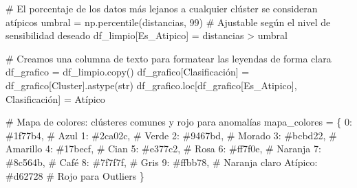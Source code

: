 \documentclass[
  spanish,
  letterpaper,
  DIV=11,
  numbers=noendperiod]{scrreprt}
\newenvironment{Shaded}{}{}
\newcommand{\BuiltInTok}[1]{\textcolor[rgb]{0.84,0.23,0.29}{#1}}
\newcommand{\CommentTok}[1]{\textcolor[rgb]{0.42,0.45,0.49}{#1}}
\newcommand{\DecValTok}[1]{\textcolor[rgb]{0.00,0.36,0.77}{#1}}
\newcommand{\NormalTok}[1]{\textcolor[rgb]{0.14,0.16,0.18}{#1}}
\newcommand{\OperatorTok}[1]{\textcolor[rgb]{0.14,0.16,0.18}{#1}}
\newcommand{\StringTok}[1]{\textcolor[rgb]{0.01,0.18,0.38}{#1}}
\begin{document}
\begin{Shaded}
\begin{Highlighting}[numbers=left,,]
\CommentTok{\# El porcentaje de los datos más lejanos a cualquier clúster se consideran atípicos}
\NormalTok{umbral }\OperatorTok{=}\NormalTok{ np.percentile(distancias, }\DecValTok{99}\NormalTok{)  }\CommentTok{\# Ajustable según el nivel de sensibilidad deseado}
\NormalTok{df\_limpio[}\StringTok{\textquotesingle{}Es\_Atipico\textquotesingle{}}\NormalTok{] }\OperatorTok{=}\NormalTok{ distancias }\OperatorTok{\textgreater{}}\NormalTok{ umbral}

\CommentTok{\# Creamos una columna de texto para formatear las leyendas de forma clara}
\NormalTok{df\_grafico }\OperatorTok{=}\NormalTok{ df\_limpio.copy()}
\NormalTok{df\_grafico[}\StringTok{\textquotesingle{}Clasificación\textquotesingle{}}\NormalTok{] }\OperatorTok{=}\NormalTok{ df\_grafico[}\StringTok{\textquotesingle{}Cluster\textquotesingle{}}\NormalTok{].astype(}\BuiltInTok{str}\NormalTok{)}
\NormalTok{df\_grafico.loc[df\_grafico[}\StringTok{\textquotesingle{}Es\_Atipico\textquotesingle{}}\NormalTok{], }\StringTok{\textquotesingle{}Clasificación\textquotesingle{}}\NormalTok{] }\OperatorTok{=} \StringTok{\textquotesingle{}Atípico\textquotesingle{}}

\CommentTok{\# Mapa de colores: clústeres comunes y rojo para anomalías}
\NormalTok{mapa\_colores }\OperatorTok{=}\NormalTok{ \{}
    \StringTok{\textquotesingle{}0\textquotesingle{}}\NormalTok{: }\StringTok{\textquotesingle{}\#1f77b4\textquotesingle{}}\NormalTok{,      }\CommentTok{\# Azul}
    \StringTok{\textquotesingle{}1\textquotesingle{}}\NormalTok{: }\StringTok{\textquotesingle{}\#2ca02c\textquotesingle{}}\NormalTok{,      }\CommentTok{\# Verde}
    \StringTok{\textquotesingle{}2\textquotesingle{}}\NormalTok{: }\StringTok{\textquotesingle{}\#9467bd\textquotesingle{}}\NormalTok{,      }\CommentTok{\# Morado}
    \StringTok{\textquotesingle{}3\textquotesingle{}}\NormalTok{: }\StringTok{\textquotesingle{}\#bcbd22\textquotesingle{}}\NormalTok{,      }\CommentTok{\# Amarillo}
    \StringTok{\textquotesingle{}4\textquotesingle{}}\NormalTok{: }\StringTok{\textquotesingle{}\#17becf\textquotesingle{}}\NormalTok{,      }\CommentTok{\# Cian}
    \StringTok{\textquotesingle{}5\textquotesingle{}}\NormalTok{: }\StringTok{\textquotesingle{}\#e377c2\textquotesingle{}}\NormalTok{,      }\CommentTok{\# Rosa}
    \StringTok{\textquotesingle{}6\textquotesingle{}}\NormalTok{: }\StringTok{\textquotesingle{}\#ff7f0e\textquotesingle{}}\NormalTok{,      }\CommentTok{\# Naranja}
    \StringTok{\textquotesingle{}7\textquotesingle{}}\NormalTok{: }\StringTok{\textquotesingle{}\#8c564b\textquotesingle{}}\NormalTok{,      }\CommentTok{\# Café}
    \StringTok{\textquotesingle{}8\textquotesingle{}}\NormalTok{: }\StringTok{\textquotesingle{}\#7f7f7f\textquotesingle{}}\NormalTok{,      }\CommentTok{\# Gris}
    \StringTok{\textquotesingle{}9\textquotesingle{}}\NormalTok{: }\StringTok{\textquotesingle{}\#ffbb78\textquotesingle{}}\NormalTok{,      }\CommentTok{\# Naranja claro}
    \StringTok{\textquotesingle{}Atípico\textquotesingle{}}\NormalTok{: }\StringTok{\textquotesingle{}\#d62728\textquotesingle{}} \CommentTok{\# Rojo para Outliers}
\NormalTok{\}}


\end{Highlighting}
\end{Shaded}
\end{document}

